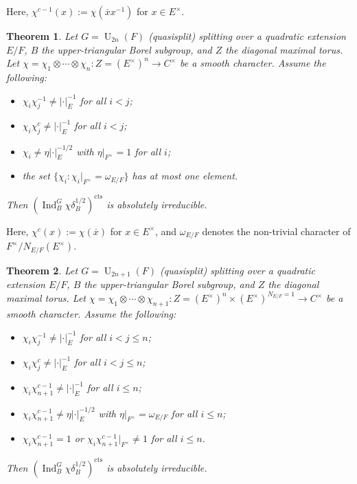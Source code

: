 \documentclass[a4paper]{amsart}
\numberwithin{equation}{section}
\newtheorem{thm}{Theorem}[section]
\theoremstyle{remark}
\theoremstyle{definition}
\DeclareMathOperator{\Ind}{Ind}
\DeclareMathOperator{\U}{U}
\newcommand{\cts}{\mathrm{cts}}
\renewcommand{\o}[1]{\overline{#1}}
\begin{document}
Here, $\chi^{c-1}(x) := \chi(\o x x^{-1})$ for $x \in E^\times$.

\begin{thm}\label{thm:U2n-irred}
  Let $G = \U_{2n}(F)$ (quasisplit) splitting over a quadratic extension $E/F$, $B$ the upper-triangular Borel subgroup, and $Z$ the diagonal maximal torus.
  Let $\chi = \chi_{1}\otimes\cdots\otimes\chi_{n}\colon Z = (E^\times)^n \to C^{\times}$ be a smooth character.
  Assume the following:
  \begin{itemize}
  \item $\chi_i \chi_j^{-1} \ne \lvert \cdot\rvert_E^{-1}$ for all $i < j$;
  \item $\chi_i \chi_j^{c} \ne \lvert \cdot\rvert_E^{-1}$ for all $i < j$;
  \item $\chi_i \ne \eta \lvert \cdot\rvert_E^{-1/2}$ with $\eta|_{F^\times} = 1$ for all $i$;
  \item the set $\{\chi_i : \chi_i|_{F^\times} = \omega_{E/F} \}$ has at most one element.
  \end{itemize}
  Then $(\Ind_{B}^{G}\chi\delta_B^{1/2})^{\cts}$ is absolutely irreducible.
\end{thm}

Here, $\chi^c(x) := \chi(\o x)$ for $x \in E^\times$, and $\omega_{E/F}$ denotes the non-trivial character of $F^\times/N_{E/F}(E^\times)$.

\begin{thm}\label{thm:U2n+1-irred}
  Let $G = \U_{2n+1}(F)$ (quasisplit) splitting over a quadratic extension $E/F$, $B$ the upper-triangular Borel subgroup, and $Z$ the diagonal maximal torus.
  Let $\chi = \chi_{1}\otimes\cdots\otimes\chi_{n+1}\colon Z = (E^\times)^n \times (E^\times)^{N_{E/F}=1}\to C^{\times}$ be a smooth character.
  Assume the following:
  \begin{itemize}
  \item $\chi_i \chi_j^{-1} \ne \lvert \cdot\rvert_E^{-1}$ for all $i < j \le n$;
  \item $\chi_i \chi_j^{c} \ne \lvert \cdot\rvert_E^{-1}$ for all $i < j \le n$;
  \item $\chi_i \chi_{n+1}^{c-1} \ne \lvert \cdot\rvert_E^{-1}$ for all $i \le n$;
  \item $\chi_i \chi_{n+1}^{c-1} \ne \eta \lvert \cdot\rvert_E^{-1/2}$ with $\eta|_{F^\times} = \omega_{E/F}$ for all $i \le n$;
  \item $\chi_i \chi_{n+1}^{c-1} = 1$ or $\chi_i \chi_{n+1}^{c-1}|_{F^\times} \ne 1$ for all $i \le n$.
  \end{itemize}
  Then $(\Ind_{B}^{G}\chi\delta_B^{1/2})^{\cts}$ is absolutely irreducible.
\end{thm}
\end{document}
